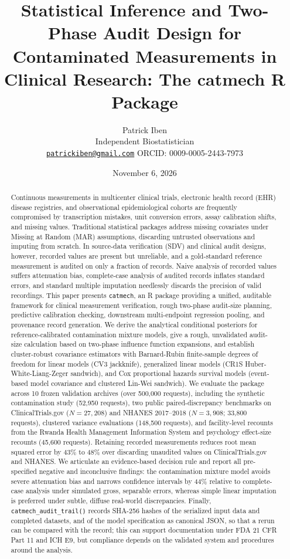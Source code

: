 \documentclass[
]{article}
\title{Statistical Inference and Two-Phase Audit Design for Contaminated
Measurements in Clinical Research: The catmech R Package}
\author{Patrick Iben\\
Independent Biostatistician\\
\href{mailto:patrickiben@gmail.com}{\nolinkurl{patrickiben@gmail.com}}
\textbar{} ORCID: 0009-0005-2443-7973}
\date{November 6, 2026}
\begin{document}
\maketitle
\begin{abstract}
Continuous measurements in multicenter clinical trials, electronic
health record (EHR) disease registries, and observational
epidemiological cohorts are frequently compromised by transcription
mistakes, unit conversion errors, assay calibration shifts, and missing
values. Traditional statistical packages address missing covariates
under Missing at Random (MAR) assumptions, discarding untrusted
observations and imputing from scratch. In source-data verification
(SDV) and clinical audit designs, however, recorded values are present
but unreliable, and a gold-standard reference measurement is audited on
only a fraction of records. Naive analysis of recorded values suffers
attenuation bias, complete-case analysis of audited records inflates
standard errors, and standard multiple imputation needlessly discards
the precision of valid recordings. This paper presents \texttt{catmech},
an R package providing a unified, auditable framework for clinical
measurement verification, rough two-phase audit-size planning,
predictive calibration checking, downstream multi-endpoint regression
pooling, and provenance record generation. We derive the analytical
conditional posteriors for reference-calibrated contamination mixture
models, give a rough, unvalidated audit-size calculation based on
two-phase influence function expansions, and establish cluster-robust
covariance estimators with Barnard-Rubin finite-sample degrees of
freedom for linear models (CV3 jackknife), generalized linear models
(CR1S Huber-White-Liang-Zeger sandwich), and Cox proportional hazards
survival models (event-based model covariance and clustered Lin-Wei
sandwich). We evaluate the package across 10 frozen validation archives
(over 500,000 requests), including the synthetic contamination study
(52,950 requests), two public paired-discrepancy benchmarks on
ClinicalTrials.gov (\(N = 27,208\)) and NHANES 2017--2018
(\(N = 3,908\); 33,800 requests), clustered variance evaluations
(148,500 requests), and facility-level recounts from the Rwanda Health
Management Information System and psychology effect-size recounts
(45,600 requests). Retaining recorded measurements reduces root mean
squared error by 43\% to 48\% over discarding unaudited values on
ClinicalTrials.gov and NHANES. We articulate an evidence-based decision
rule and report all pre-specified negative and inconclusive findings:
the contamination mixture model avoids severe attenuation bias and
narrows confidence intervals by 44\% relative to complete-case analysis
under simulated gross, separable errors, whereas simple linear
imputation is preferred under subtle, diffuse real-world discrepancies.
Finally, \texttt{catmech\_audit\_trail()} records SHA-256 hashes of the
serialized input data and completed datasets, and of the model
specification as canonical JSON, so that a rerun can be compared with
the record; this can support documentation under FDA 21 CFR Part 11 and
ICH E9, but compliance depends on the validated system and procedures
around the analysis.
\end{abstract}
\end{document}
